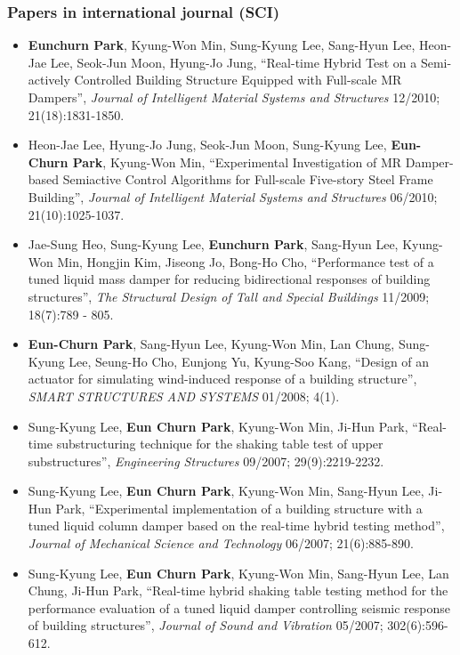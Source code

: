 \subsubsection*{Papers in international journal (SCI)}
\begin{itemize}
\item
  \textbf{Eunchurn Park}, Kyung-Won Min, Sung-Kyung Lee, Sang-Hyun Lee,
  Heon-Jae Lee, Seok-Jun Moon, Hyung-Jo Jung, ``Real-time Hybrid Test on
  a Semi-actively Controlled Building Structure Equipped with Full-scale
  MR Dampers'', \emph{Journal of Intelligent Material Systems and
  Structures} 12/2010; 21(18):1831-1850.
\item
  Heon-Jae Lee, Hyung-Jo Jung, Seok-Jun Moon, Sung-Kyung Lee,
  \textbf{Eun-Churn Park}, Kyung-Won Min, ``Experimental Investigation
  of MR Damper-based Semiactive Control Algorithms for Full-scale
  Five-story Steel Frame Building'', \emph{Journal of Intelligent
  Material Systems and Structures} 06/2010; 21(10):1025-1037. 
\item
  Jae-Sung Heo, Sung-Kyung Lee, \textbf{Eunchurn Park}, Sang-Hyun Lee,
  Kyung-Won Min, Hongjin Kim, Jiseong Jo, Bong-Ho Cho, ``Performance
  test of a tuned liquid mass damper for reducing bidirectional
  responses of building structures'', \emph{The Structural Design of
  Tall and Special Buildings} 11/2009; 18(7):789 - 805.
\item
  \textbf{Eun-Churn Park}, Sang-Hyun Lee, Kyung-Won Min, Lan Chung,
  Sung-Kyung Lee, Seung-Ho Cho, Eunjong Yu, Kyung-Soo Kang, ``Design of
  an actuator for simulating wind-induced response of a building
  structure'', \emph{SMART STRUCTURES AND SYSTEMS} 01/2008; 4(1).
\item
  Sung-Kyung Lee, \textbf{Eun Churn Park}, Kyung-Won Min, Ji-Hun Park,
  ``Real-time substructuring technique for the shaking table test of
  upper substructures'', \emph{Engineering Structures} 09/2007;
  29(9):2219-2232.
\item
  Sung-Kyung Lee, \textbf{Eun Churn Park}, Kyung-Won Min, Sang-Hyun Lee,
  Ji-Hun Park, ``Experimental implementation of a building structure
  with a tuned liquid column damper based on the real-time hybrid
  testing method'', \emph{Journal of Mechanical Science and Technology}
  06/2007; 21(6):885-890.
\item
  Sung-Kyung Lee, \textbf{Eun Churn Park}, Kyung-Won Min, Sang-Hyun Lee,
  Lan Chung, Ji-Hun Park, ``Real-time hybrid shaking table testing
  method for the performance evaluation of a tuned liquid damper
  controlling seismic response of building structures'', \emph{Journal
  of Sound and Vibration} 05/2007; 302(6):596-612.
\end{itemize}
